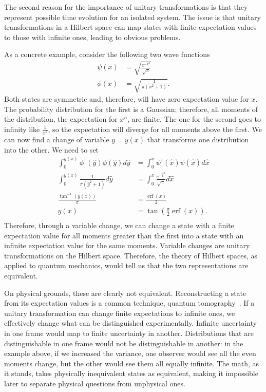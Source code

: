 \documentclass[10pt,twocolumn, nofootinbib]{revtex4-2}
\DeclareMathOperator{\erf}{erf}
\begin{document}
The second reason for the importance of unitary transformations is that they represent possible time evolution for an isolated system. The issue is that unitary transformations in a Hilbert space can map states with finite expectation values to those with infinite ones, leading to obvious problems.

As a concrete example, consider the following two wave functions
\begin{align}
\psi(x) &= \sqrt{\frac{e^{-x^2}}{\sqrt{\pi}}} \\
\phi(x) &= \sqrt{\frac{1}{\pi(x^2 + 1)}}.
\end{align}
Both states are symmetric and, therefore, will have zero expectation value for $x$. The probability distribution for the first is a Gaussian; therefore, all moments of the distribution, the expectation for $x^n$, are finite. The one for the second goes to infinity like $\frac{1}{x^2}$, so the expectation will diverge for all moments above the first. We can now find a change of variable $y=y(x)$ that transforms one distribution into the other. We need to set
\begin{equation}
\begin{aligned}
\int_{0}^{y(x)} \phi^\dagger(\hat{y}) \phi(\hat{y}) d\hat{y} &= \int_{0}^{x} \psi^\dagger(\hat{x}) \psi(\hat{x}) d\hat{x} \\
\int_{0}^{y(x)} \frac{1}{\pi(\hat{y}^2 + 1)} d\hat{y} &= \int_{0}^{x} \frac{e^{-\hat{x}^2}}{\sqrt{\pi}} d\hat{x} \\
\frac{\tan^{-1}(y(x))}{\pi} &= \frac{\erf(x)}{2} \\
y(x) &= \tan \left(\frac{\pi}{2}\erf(x)\right). \\
\end{aligned}
\end{equation}
Therefore, through a variable change, we can change a state with a finite expectation value for all moments greater than the first into a state with an infinite expectation value for the same moments. Variable changes are unitary transformations on the Hilbert space. Therefore, the theory of Hilbert spaces, as applied to quantum mechanics, would tell us that the two representations are equivalent.

On physical grounds, these are clearly not equivalent. Reconstructing a state from its expectation values is a common technique, quantum tomography~\cite{banaszek2013focus}. If a unitary transformation can change finite expectations to infinite ones, we effectively change what can be distinguished experimentally. Infinite uncertainty in one frame would map to finite uncertainty in another. Distributions that are distinguishable in one frame would not be distinguishable in another: in the example above, if we increased the variance, one observer would see all the even moments change, but the other would see them all equally infinite. The math, as it stands, takes physically inequivalent states as equivalent, making it impossible later to separate physical questions from unphysical ones.
\end{document}
